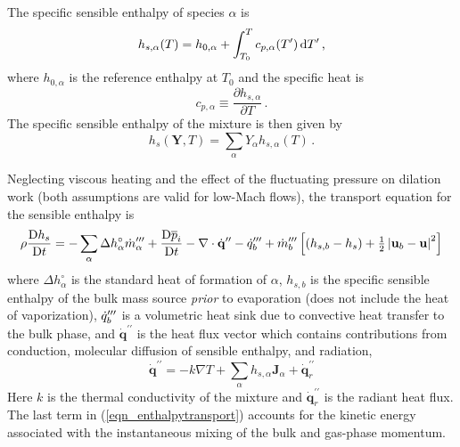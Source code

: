 The specific sensible enthalpy of species $\alpha$ is
\begin{equation}
\label{eqn_sensible}
h_{s,\alpha}(T) = h_{0,\alpha} + \int_{T_0}^{T} c_{p,\alpha}(T^\prime) \,\mathrm{d} T^\prime \,\mbox{,}
\end{equation}
where $h_{0,\alpha}$ is the reference enthalpy at $T_0$ and the specific heat is
\begin{equation}
\label{eqn_specificheat}
c_{p,\alpha} \equiv \frac{\partial h_{s,\alpha}}{\partial T} \,\mbox{.}
\end{equation}
The specific sensible enthalpy of the mixture is then given by
\begin{equation}
\label{eqn_chemsensmix}
h_s(\mathbf{Y},T) = \sum_\alpha Y_\alpha h_{s,\alpha}(T) \,\mbox{.}
\end{equation}

Neglecting viscous heating and the effect of the fluctuating pressure on dilation work (both assumptions are valid for low-Mach flows), the transport equation for the sensible enthalpy is
\begin{equation}
\label{eqn_enthalpytransport}
\rho \frac{\mbox{D} h_s }{\mbox{D} t} = -\sum_\alpha \Delta h^\circ_\alpha \dot{m}_{\alpha}^{{\prime\prime\prime}} + \frac{\mbox{D} \overline{p}_i }{\mbox{D} t} - \nabla\cdot \dot{\mathbf{q}}^{\prime\prime} - \dot{q}_b''' + \dot{m}_{b}^{{\prime\prime\prime}} \left[ ( h_{s,b} - h_s ) + \mbox{$\frac{1}{2}$}\left|\mathbf{u}_b-\mathbf{u}\right|^2 \right]
\end{equation}
where $\Delta h^\circ_\alpha$ is the standard heat of formation of $\alpha$, $h_{s,b}$ is the specific sensible enthalpy of the bulk mass source \emph{prior} to evaporation (does not include the heat of vaporization), $\dot{q}_b^{\prime\prime\prime}$ is a volumetric heat sink due to convective heat transfer to the bulk phase, and $\dot{\mathbf{q}}^{\prime\prime}$ is the heat flux vector which contains contributions from conduction, molecular diffusion of sensible enthalpy, and radiation,
\begin{equation}
\label{eqn_heatflux}
\dot{\mathbf{q}}^{\prime\prime} = -k \nabla T + \sum_\alpha h_{s,\alpha} \mathbf{J}_{\alpha} + \dot{\mathbf{q}}^{\prime\prime}_{r}
\end{equation}
Here $k$ is the thermal conductivity of the mixture and $\dot{\mathbf{q}}^{\prime\prime}_{r}$ is the radiant heat flux.  The last term in (\ref{eqn_enthalpytransport}) accounts for the kinetic energy associated with the instantaneous mixing of the bulk and gas-phase momentum.


